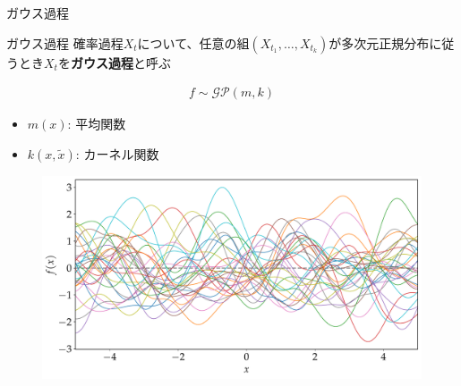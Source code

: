 \begin{frame}{ガウス過程}
  \begin{block}{ガウス過程}
    確率過程$X_{t}$について、任意の組$(X_{t_{1}},\dots,X_{t_{k}})$が多次元正規分布に従うとき$X_{t}$を\textbf{ガウス過程}と呼ぶ
  \end{block}
  \begin{align*}
    f\sim\mathcal{GP}(m,k)
  \end{align*}
  \begin{itemize}
    \item $m(x)$: 平均関数
    \item $k(x,\tilde{x})$: カーネル関数
  \end{itemize}
  \begin{figure}
    \includegraphics[height=0.4\textheight]{figs/rbf_sample.pdf}
  \end{figure}
\end{frame}

